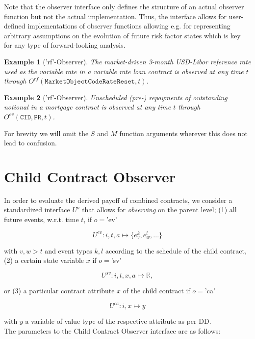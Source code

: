 \documentclass[9pt,oneside]{amsart}
\newtheorem{example}{Example}
\newcommand{\Real}{\mathbb{R}}
\newcommand{\attr}[1]{\texttt{#1}}
\newcommand{\obs}[3]{O^{#1}(#2,#3)}
\newcommand{\cldfunc}[1]{U^{#1}}
\begin{document}
\begin{multicols}{2}
Note that the observer interface only defines the structure of an actual observer function but not the actual implementation. Thus, the interface allows for user-defined implementations of observer functions allowing e.g. for representing arbitrary assumptions on the evolution of future risk factor states which is key for any type of forward-looking analysis.

\begin{example}['rf'-Observer] The market-driven 3-month USD-Libor reference rate used as the variable rate in a variable rate loan contract is observed at any time $t$ through $\obs{rf}{\attr{MarketObjectCodeRateReset}}{t}$.
\end{example}

\begin{example}['rf'-Observer] Unscheduled (pre-) repayments of outstanding notional in a mortgage contract is observed at any time $t$ through $\obs{ev}{\attr{CID},\attr{PR}}{t}$.
\end{example}

For brevity we will omit the $S$ and $M$ function arguments wherever this does not lead to confusion.



\section{Child Contract Observer}\label{sec:cldobserver}

In order to evaluate the derived payoff of combined contracts, we consider a standardized interface $\cldfunc{o}$ that allows for \textit{observing} on the parent level; (1) all future events, w.r.t. time $t$, if $o=$'ev'

\[
	\cldfunc{ev}: i,t,a \mapsto \{e_v^{k},e_w^{l},...\}
\]

with $v,w>t$ and event types $k,l$ according to the schedule of the child contract, (2) a certain state variable $x$ if $o=$'sv'

\[
	\cldfunc{sv}: i,t,x,a \mapsto \Real,
\]

or (3) a particular contract attribute $x$ of the child contract if $o=$'ca'

\[
	\cldfunc{ca}: i,x \mapsto y
\]

with $y$ a variable of value type of the respective attribute as per DD.\\

The parameters to the Child Contract Observer interface are as follows:


\end{multicols}
\end{document}
